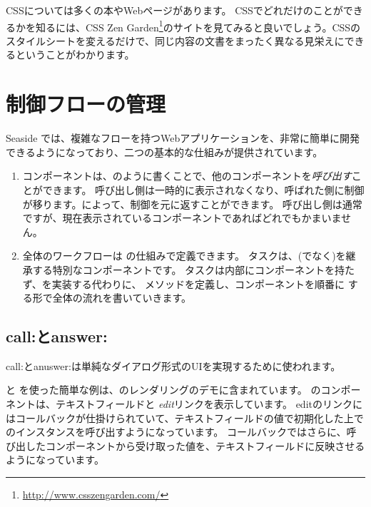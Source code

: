 \documentclass[a4paper,10pt,twoside]{book}
\begin{document}
CSSについては多くの本やWebページがあります。
CSSでどれだけのことができるかを知るには、CSS Zen Garden\footnote{\url{http://www.csszengarden.com/}}のサイトを見てみると良いでしょう。CSSのスタイルシートを変えるだけで、同じ内容の文書をまったく異なる見栄えにできるということがわかります。

\section{制御フローの管理}

Seaside では、複雑なフローを持つWebアプリケーションを、非常に簡単に開発できるようになっており、二つの基本的な仕組みが提供されています。

\begin{enumerate}
  \item コンポーネントは、のように書くことで、他のコンポーネントを\emph{呼び出す}ことができます。
    呼び出し側は一時的に表示されなくなり、呼ばれた側に制御が移ります。によって、制御を元に返すことができます。
    呼び出し側は通常 ですが、現在表示されているコンポーネントであればどれでもかまいません。

  \item 全体のワークフローは の仕組みで定義できます。
    タスクは、(でなく)を継承する特別なコンポーネントです。
    タスクは内部にコンポーネントを持たず、を実装する代わりに、 メソッドを定義し、コンポーネントを順番に する形で全体の流れを書いていきます。
\end{enumerate}

\subsection{call:とanswer:}

call:とanuswer:は単純なダイアログ形式のUIを実現するために使われます。

 と  を使った簡単な例は、のレンダリングのデモに含まれています。
 のコンポーネントは、テキストフィールドと \emph{edit}リンクを表示しています。
editのリンクにはコールバックが仕掛けられていて、テキストフィールドの値で初期化した上でのインスタンスを呼び出すようになっています。
コールバックではさらに、呼び出したコンポーネントから受け取った値を、テキストフィールドに反映させるようになっています。
 
\end{document}
